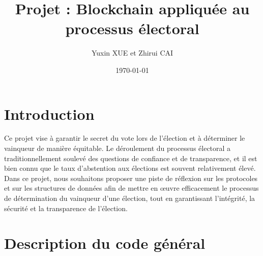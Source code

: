 \documentclass{article}
\title{Projet : Blockchain appliquée au processus électoral}
\author{Yuxin XUE et Zhirui CAI}
\date{\today}
\begin{document}
\maketitle

\mbox{}
\hspace{15mm}

\begin{figure}[!b]
    \center
\end{figure}
\newpage

\tableofcontents
\newpage
\section{Introduction}
Ce projet vise à garantir le secret du vote lors de l'élection et à déterminer le vainqueur de manière équitable.\newline
Le déroulement du processus électoral a traditionnellement soulevé des questions de confiance et de transparence, et il est bien connu que le taux d'abstention aux élections est souvent relativement élevé.
Dans ce projet, nous souhaitons proposer une piste de réflexion sur les protocoles et sur les structures de données afin de mettre en œuvre efficacement le processus de détermination du vainqueur d'une élection, tout en garantissant l'intégrité, la sécurité et la transparence de l'élection.
\section{Description du code général}
\end{document}
